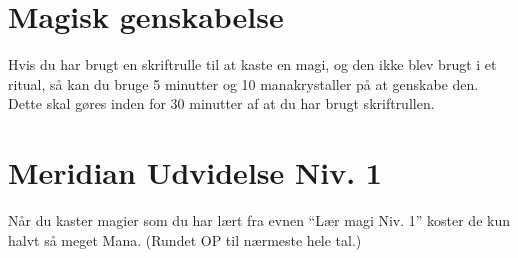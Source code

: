 \section{Magisk genskabelse}
Hvis du har brugt en skriftrulle til at kaste en magi, og den ikke blev brugt i et ritual, så kan du bruge 5 minutter og 10 manakrystaller på at genskabe den. Dette skal gøres inden for 30 minutter af at du har brugt skriftrullen.

\section{Meridian Udvidelse Niv. 1}
Når du kaster magier som du har lært fra evnen “Lær magi Niv. 1” koster de kun halvt så meget Mana. (Rundet OP til nærmeste hele tal.)